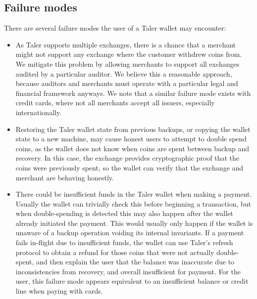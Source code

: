 \documentclass{IEEEtran}
\begin{document}
\subsection{Failure modes}

There are several failure modes the user of a Taler wallet may
encounter:

\begin{itemize}
\item
As Taler supports multiple exchanges, there is a chance that a
merchant might not support any exchange where the customer withdrew
coins from.  We mitigate this problem by allowing merchants to
support all exchanges audited by a particular auditor.  We believe
this a reasonable approach, because auditors and merchants must
operate with a particular legal and financial framework anyways.  We
note that a similar failure mode exists with credit cards, where not
all merchants accept all issuers, especially internationally.

\item
Restoring the Taler wallet state from previous backups, or copying the
wallet state to a new machine, may cause honest users to attempt to
double spend coins, as the wallet does not know when coins are spent
between backup and recovery.  In this case, the exchange provides
cryptographic proof that the coins were previously spent, so the
wallet can verify that the exchange and merchant are behaving honestly.

%
%
%
%
\item
There could be insufficient funds in the Taler wallet when making a
payment.  Usually the wallet can trivially check this before beginning
a transaction, but when double-spending is detected this may also
happen after the wallet already initiated the payment. This would
usually only happen if the wallet is unaware of a backup operation
voiding its internal invariants.  If a payment fails in-flight due to
insufficient funds, the wallet can use Taler's refresh protocol to
obtain a refund for those coins that were not actually double-spent,
and then explain the user that the balance was inaccurate due to
inconsistencies from recovery, and overall insufficient for payment.
For the user, this failure mode appears equivalent to an insufficient
balance or credit line when paying with cards.
\end{itemize}
\end{document}
